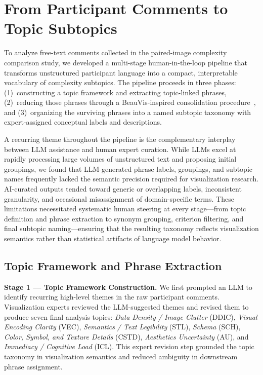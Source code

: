 \documentclass[journal]{IEEEtran}
\begin{document}
\section{From Participant Comments to Topic Subtopics}
\label{sec:pipeline}

To analyze free-text comments collected in the paired-image complexity comparison study, we developed a multi-stage human-in-the-loop pipeline that transforms unstructured participant language into a compact, interpretable vocabulary of complexity subtopics. The pipeline proceeds in three phases: (1)~constructing a topic framework and extracting topic-linked phrases, (2)~reducing those phrases through a BeauVis-inspired consolidation procedure~\cite{he2022beauvis}, and (3)~organizing the surviving phrases into a named subtopic taxonomy with expert-assigned conceptual labels and descriptions.

A recurring theme throughout the pipeline is the complementary interplay between LLM assistance and human expert curation. While LLMs excel at rapidly processing large volumes of unstructured text and proposing initial groupings, we found that LLM-generated phrase labels, groupings, and subtopic names frequently lacked the semantic precision required for visualization research. AI-curated outputs tended toward generic or overlapping labels, inconsistent granularity, and occasional misassignment of domain-specific terms. These limitations necessitated systematic human steering at every stage---from topic definition and phrase extraction to synonym grouping, criterion filtering, and final subtopic naming---ensuring that the resulting taxonomy reflects visualization semantics rather than statistical artifacts of language model behavior.

\subsection{Topic Framework and Phrase Extraction}
\label{sec:extraction}

\noindent\textbf{Stage 1 — Topic Framework Construction.}
We first prompted an LLM to identify recurring high-level themes in the raw participant comments.
Visualization experts reviewed the LLM-suggested themes and revised them to produce seven final analysis topics:
\textit{Data Density / Image Clutter} (DDIC),
\textit{Visual Encoding Clarity} (VEC),
\textit{Semantics / Text Legibility} (STL),
\textit{Schema} (SCH),
\textit{Color, Symbol, and Texture Details} (CSTD),
\textit{Aesthetics Uncertainty} (AU), and
\textit{Immediacy / Cognitive Load} (ICL).
This expert revision step grounded the topic taxonomy in visualization semantics and reduced ambiguity in downstream phrase assignment.
\end{document}
